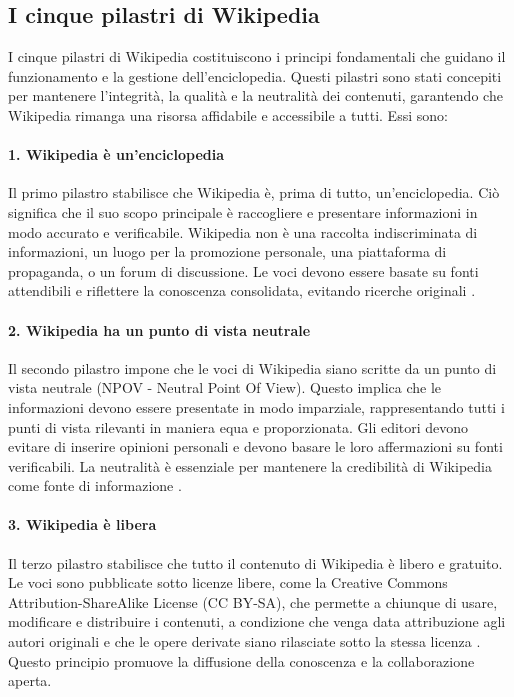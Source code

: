 \documentclass[12pt,a4paper]{report}
\begin{document}
\subsection{I cinque pilastri di Wikipedia}

I cinque pilastri di Wikipedia costituiscono i principi fondamentali che guidano il funzionamento e la gestione dell'enciclopedia. Questi pilastri sono stati concepiti per mantenere l'integrità, la qualità e la neutralità dei contenuti, garantendo che Wikipedia rimanga una risorsa affidabile e accessibile a tutti. Essi sono:

\paragraph*{1. Wikipedia è un'enciclopedia}
Il primo pilastro stabilisce che Wikipedia è, prima di tutto, un'enciclopedia. Ciò significa che il suo scopo principale è raccogliere e presentare informazioni in modo accurato e verificabile. Wikipedia non è una raccolta indiscriminata di informazioni, un luogo per la promozione personale, una piattaforma di propaganda, o un forum di discussione. Le voci devono essere basate su fonti attendibili e riflettere la conoscenza consolidata, evitando ricerche originali \cite{reagle2010good}.

\paragraph*{2. Wikipedia ha un punto di vista neutrale}
Il secondo pilastro impone che le voci di Wikipedia siano scritte da un punto di vista neutrale (NPOV - Neutral Point Of View). Questo implica che le informazioni devono essere presentate in modo imparziale, rappresentando tutti i punti di vista rilevanti in maniera equa e proporzionata. Gli editori devono evitare di inserire opinioni personali e devono basare le loro affermazioni su fonti verificabili. La neutralità è essenziale per mantenere la credibilità di Wikipedia come fonte di informazione \cite{denning2005wikipedia}.

\paragraph*{3. Wikipedia è libera}
Il terzo pilastro stabilisce che tutto il contenuto di Wikipedia è libero e gratuito. Le voci sono pubblicate sotto licenze libere, come la Creative Commons Attribution-ShareAlike License (CC BY-SA), che permette a chiunque di usare, modificare e distribuire i contenuti, a condizione che venga data attribuzione agli autori originali e che le opere derivate siano rilasciate sotto la stessa licenza \cite{jemielniak2014wikipedia}. Questo principio promuove la diffusione della conoscenza e la collaborazione aperta.
\end{document}
